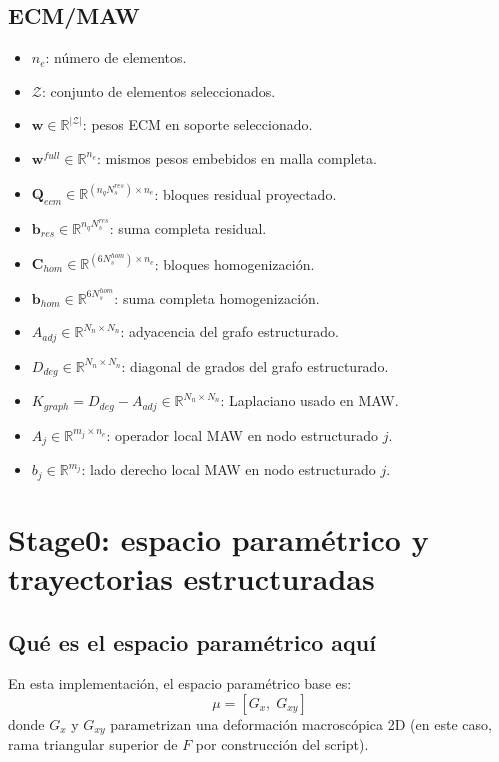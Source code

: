 \documentclass[11pt,a4paper]{article}
\begin{document}
\subsection{ECM/MAW}
\begin{itemize}[leftmargin=1.5em]
\item $n_e$: número de elementos.
\item $\mathcal{Z}$: conjunto de elementos seleccionados.
\item $\mathbf{w}\in\mathbb{R}^{|\mathcal{Z}|}$: pesos ECM en soporte seleccionado.
\item $\mathbf{w}^{full}\in\mathbb{R}^{n_e}$: mismos pesos embebidos en malla completa.
\item $\mathbf{Q}_{ecm}\in\mathbb{R}^{(n_q N_s^{res})\times n_e}$: bloques residual proyectado.
\item $\mathbf{b}_{res}\in\mathbb{R}^{n_q N_s^{res}}$: suma completa residual.
\item $\mathbf{C}_{hom}\in\mathbb{R}^{(6N_s^{hom})\times n_e}$: bloques homogenización.
\item $\mathbf{b}_{hom}\in\mathbb{R}^{6N_s^{hom}}$: suma completa homogenización.
\item $A_{adj}\in\mathbb{R}^{N_n\times N_n}$: adyacencia del grafo estructurado.
\item $D_{deg}\in\mathbb{R}^{N_n\times N_n}$: diagonal de grados del grafo estructurado.
\item $K_{graph}=D_{deg}-A_{adj}\in\mathbb{R}^{N_n\times N_n}$: Laplaciano usado en MAW.
\item $A_j\in\mathbb{R}^{m_j\times n_c}$: operador local MAW en nodo estructurado $j$.
\item $b_j\in\mathbb{R}^{m_j}$: lado derecho local MAW en nodo estructurado $j$.
\end{itemize}

\section{Stage0: espacio paramétrico y trayectorias estructuradas}
\subsection{Qué es el espacio paramétrico aquí}
En esta implementación, el espacio paramétrico base es:
\[
\mu = [G_x,\; G_{xy}]
\]
donde $G_x$ y $G_{xy}$ parametrizan una deformación macroscópica 2D (en este caso, rama triangular superior de $F$ por construcción del script).
\end{document}
